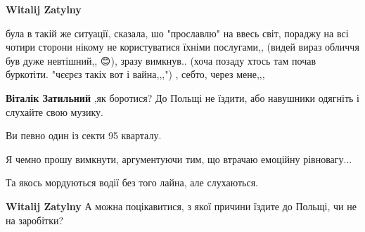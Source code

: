 \begin{itemize}
\begin{itemize}
\textbf{Witalij Zatylny} 

була в такій же ситуації, сказала, шо "прославлю" на ввесь світ, пораджу на всі
чотири сторони нікому не користуватися їхніми послугами,, (видей вираз обличчя
був дуже невтішний,, 😊), зразу вимкнув.. (хоча позаду хтось там почав
буркотіти. "чєєрєз такіх вот і вайна,,,") , себто, через мене,,,


 
\textbf{Віталік Затильний} ,як боротися? До Польщі не їздити, або навушники одягніть і слухайте свою музику.

\begin{itemize}
 
Ви певно один із секти 95 кварталу.
\end{itemize}

 
Я чемно прошу вимкнути, аргументуючи тим, що втрачаю емоційну рівновагу...

Та якось мордуються водії без того лайна, але слухаються.


 
\textbf{Witalij Zatylny} А можна поцікавитися, з якої причини їздите до Польщі, чи не на заробітки?

\begin{itemize}
 

\end{itemize}
\end{itemize}
\end{itemize}
